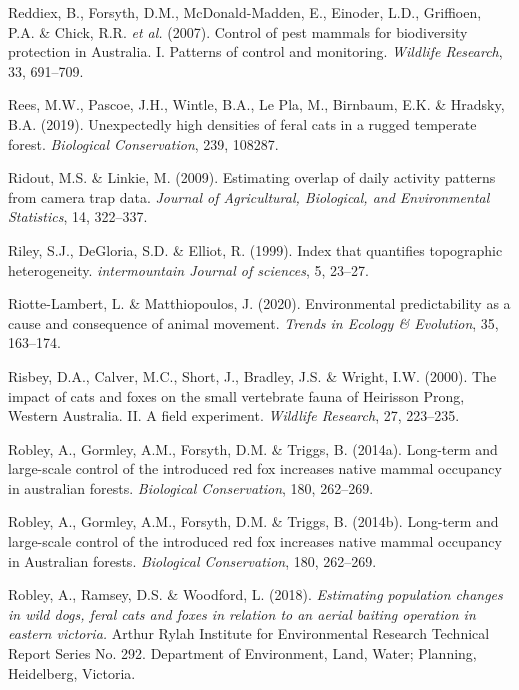 \documentclass[11pt,a4paper,titlepage,twoside,openright]{style/unimelbthesis}
\begin{document}
\begin{mainmatter}
\leavevmode\hypertarget{ref-reddiex2007control}{}%
Reddiex, B., Forsyth, D.M., McDonald-Madden, E., Einoder, L.D., Griffioen, P.A. \& Chick, R.R. \emph{et al.} (2007). Control of pest mammals for biodiversity protection in Australia. I. Patterns of control and monitoring. \emph{Wildlife Research}, 33, 691--709.

\leavevmode\hypertarget{ref-rees2019unexpectedly}{}%
Rees, M.W., Pascoe, J.H., Wintle, B.A., Le Pla, M., Birnbaum, E.K. \& Hradsky, B.A. (2019). Unexpectedly high densities of feral cats in a rugged temperate forest. \emph{Biological Conservation}, 239, 108287.

\leavevmode\hypertarget{ref-ridout2009estimating}{}%
Ridout, M.S. \& Linkie, M. (2009). Estimating overlap of daily activity patterns from camera trap data. \emph{Journal of Agricultural, Biological, and Environmental Statistics}, 14, 322--337.

\leavevmode\hypertarget{ref-riley1999index}{}%
Riley, S.J., DeGloria, S.D. \& Elliot, R. (1999). Index that quantifies topographic heterogeneity. \emph{intermountain Journal of sciences}, 5, 23--27.

\leavevmode\hypertarget{ref-riotte-lambert2020environmental}{}%
Riotte-Lambert, L. \& Matthiopoulos, J. (2020). Environmental predictability as a cause and consequence of animal movement. \emph{Trends in Ecology \& Evolution}, 35, 163--174.

\leavevmode\hypertarget{ref-risbey2000impacts}{}%
Risbey, D.A., Calver, M.C., Short, J., Bradley, J.S. \& Wright, I.W. (2000). The impact of cats and foxes on the small vertebrate fauna of Heirisson Prong, Western Australia. II. A field experiment. \emph{Wildlife Research}, 27, 223--235.

\leavevmode\hypertarget{ref-ROBLEY2014262}{}%
Robley, A., Gormley, A.M., Forsyth, D.M. \& Triggs, B. (2014a). Long-term and large-scale control of the introduced red fox increases native mammal occupancy in australian forests. \emph{Biological Conservation}, 180, 262--269.

\leavevmode\hypertarget{ref-robley2014long}{}%
Robley, A., Gormley, A.M., Forsyth, D.M. \& Triggs, B. (2014b). Long-term and large-scale control of the introduced red fox increases native mammal occupancy in Australian forests. \emph{Biological Conservation}, 180, 262--269.

\leavevmode\hypertarget{ref-robley2018estimating}{}%
Robley, A., Ramsey, D.S. \& Woodford, L. (2018). \emph{Estimating population changes in wild dogs, feral cats and foxes in relation to an aerial baiting operation in eastern victoria.} Arthur Rylah Institute for Environmental Research Technical Report Series No. 292. Department of Environment, Land, Water; Planning, Heidelberg, Victoria.


\end{mainmatter}
\end{document}
